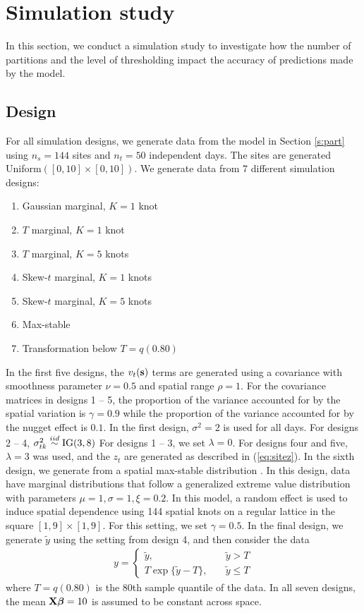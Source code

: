 \documentclass[11pt]{article}
\begin{document}
\section{Simulation study}\label{s:simstudy}
In this section, we conduct a simulation study to investigate how the number of partitions and the level of thresholding impact the accuracy of predictions made by the model.

\subsection{Design}\label{s:simdesign}
For all simulation designs, we generate data from the model in Section \ref{s:part} using $n_s=144$ sites and $n_t=50$ independent days.
The sites are generated Uniform$([0, 10] \times [0, 10])$.
We generate data from 7 different simulation designs:
\begin{enumerate} \setlength{\itemsep}{-0.5em}
  \item Gaussian marginal, $K=1$ knot
  \item $T$ marginal, $K=1$ knot
  \item $T$ marginal, $K=5$ knots
  \item Skew-$t$ marginal, $K=1$ knots
  \item Skew-$t$ marginal, $K=5$ knots
  \item Max-stable
  \item Transformation below $T = q(0.80)$
\end{enumerate}
In the first five designs, the $v_t(\mbox{\bf s})$ terms are generated using a \Matern covariance with smoothness parameter $\nu = 0.5$ and spatial range $\rho = 1$.
For the covariance matrices in designs 1 -- 5, the proportion of the variance accounted for by the spatial variation is $\gamma = 0.9$ while the proportion of the variance accounted for by the nugget effect is $0.1$.
In the first design, $\sigma^2 = 2$ is used for all days.
For designs 2 -- 4, $\sigma^2_{tk} \stackrel{iid}{\sim} \text{IG}(3, 8)$
For designs 1 -- 3, we set $\lambda = 0$.
For designs four and five, $\lambda = 3$ was used, and the $z_t$ are generated as described in (\ref{eq:sitez}).
In the sixth design, we generate from a spatial max-stable distribution \citep{Reich2012}.
In this design, data have marginal distributions that follow a generalized extreme value distribution with parameters $\mu = 1, \sigma=1, \xi=0.2$.
In this model, a random effect is used to induce spatial dependence using 144 spatial knots on a regular lattice in the square $[1, 9] \times [1, 9]$.
For this setting, we set $\gamma = 0.5$.
In the final design, we generate $\tilde{y}$ using the setting from design 4, and then consider the data
\begin{align}
  y = \left\{ \begin{array}{lc}
    \tilde{y}, \quad & \tilde{y} > T \\[0.5em]
    T \exp\{\tilde{y} - T\}, \quad & \tilde{y} \le T
  \end{array}\right.
\end{align}
where $T = q(0.80)$ is the 80th sample quantile of the data.
In all seven designs, the mean $\mbox{\bf X} \mbox{\boldmath $\beta$} = 10$ is assumed to be constant across space.
\end{document}
